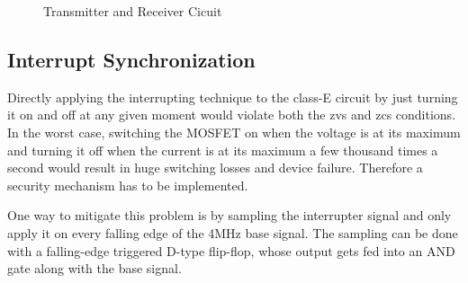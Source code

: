 \begin{figure}[h!]
    \centering
    \caption{Transmitter and Receiver Cicuit}
    \label{fig:transmitter-receiver}
\end{figure}

\subsection{Interrupt Synchronization}

Directly applying the interrupting technique to the class-E circuit by just turning it on and off at any given moment would violate both the \gls{zvs} and \gls{zcs} conditions. In the worst case, switching the MOSFET on when the voltage is at its maximum and turning it off when the current is at its maximum a few thousand times a second would result in huge switching losses and device failure. Therefore a security mechanism has to be implemented.

One way to mitigate this problem is by sampling the interrupter signal and only apply it on every falling edge of the 4MHz base signal. The sampling can be done with a falling-edge triggered D-type flip-flop, whose output gets fed into an AND gate along with the base signal.

\vspace{5mm}

